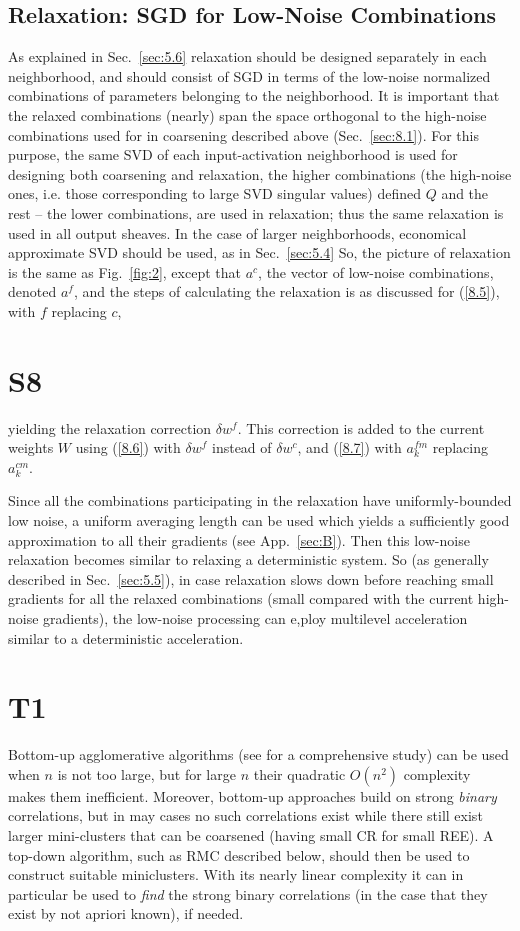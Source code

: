 \documentclass{article} %
\begin{document}
\subsection{Relaxation: SGD for Low-Noise Combinations}
\label{sec:sgd_relaxation}
As explained in Sec.~\ref{sec:5.6} relaxation should be designed separately in each neighborhood, and should consist of SGD in terms of the low-noise normalized combinations of parameters belonging to the neighborhood. It is important that the relaxed combinations (nearly) span the space orthogonal to the high-noise combinations used for in coarsening described above (Sec.~\ref{sec:8.1}). For this purpose, the same SVD of each input-activation neighborhood is used for designing both coarsening and relaxation, the higher combinations (the high-noise ones, i.e. those corresponding to large SVD singular values) defined $Q$ and the rest -- the lower combinations, are used in relaxation; thus the same relaxation is used in all output sheaves. In the case of larger neighborhoods, economical approximate SVD should be used, as in Sec.~\ref{sec:5.4} So, the picture of relaxation is the same as Fig.~\ref{fig:2}, except that $a^c$, the vector of low-noise combinations, denoted $a^f$, and the steps of calculating the relaxation is as discussed for (\ref{8.5}), with $f$ replacing $c$,

\section{S8}
yielding the relaxation correction $\delta w^f$. This correction is added to the current weights $W$ using (\ref{8.6}) with $\delta w^f$ instead of $\delta w^c$, and (\ref{8.7}) with $a^{fm}_k$ replacing $a^{cm}_k$.

Since all the combinations participating in the relaxation have uniformly-bounded low noise, a uniform averaging length can be used which yields a sufficiently good approximation to all their gradients (see App.~\ref{sec:B}). Then this low-noise relaxation becomes similar to relaxing a deterministic system. So (as generally described in Sec.~\ref{sec:5.5}), in case relaxation slows down before reaching small gradients for all the relaxed combinations (small compared with the current high-noise gradients), the low-noise processing can e,ploy multilevel acceleration similar to a deterministic acceleration.

\section{T1}
Bottom-up agglomerative algorithms (see \cite{17} for a comprehensive study) can be used when $n$ is not too large, but for large $n$ their quadratic $O(n^2)$ complexity makes them inefficient. Moreover, bottom-up approaches build on strong {\it binary} correlations, but in may cases no such correlations exist while there still exist larger mini-clusters that can be coarsened (having small CR for small REE). A top-down algorithm, such as RMC described below, should then be used to construct suitable miniclusters. With its nearly linear complexity it can in particular be used to {\it find} the strong binary correlations (in the case that they exist by not apriori known), if needed.
\end{document}
